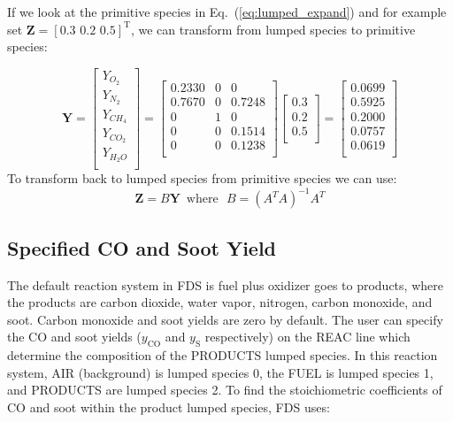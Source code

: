 If we look at the primitive species in Eq.~(\ref{eq:lumped_expand}) and for example set $\mathbf{Z} = [0.3\, \, 0.2\, \, 0.5]^\mathrm{T}$, we can transform from lumped species to primitive species:

\begin{displaymath}
\mathbf{Y}=\left[\begin{array}{c}
       Y_{O_2} \\
       Y_{N_2} \\
       Y_{CH_4} \\
       Y_{CO_2} \\
       Y_{H_2O} \\
     \end{array}\right]
     =\left[\begin{array}{ccc}
     0.2330 & 0 & 0 \\
     0.7670 & 0 & 0.7248 \\
     0 & 1 & 0 \\
     0 & 0 & 0.1514 \\
     0 & 0 & 0.1238 \\
     \end{array}\right]
     \left[\begin{array}{c}
     0.3 \\
     0.2 \\
     0.5 \\
     \end{array}\right]
     =\left[\begin{array}{c}
     0.0699\\
     0.5925\\
     0.2000\\
     0.0757\\
     0.0619\\
     \end{array}\right]
\end{displaymath}
To transform back to lumped species from primitive species we can use:
\begin{equation}\label{eq:transform_back}
\textbf{Z}=B\textbf{Y} \, \, \, \text{where} \, \, \, \, B=(A^TA)^{-1}A^T
\end{equation}

\subsection{Specified CO and Soot Yield}
The default reaction system in FDS is fuel plus oxidizer goes to products, where the products are carbon dioxide, water vapor, nitrogen, carbon monoxide, and soot. Carbon monoxide and soot yields are zero by default. The user can specify the CO and soot yields ($y_{\mathrm{CO}}$ and $y_{\mathrm{S}}$ respectively) on the {\ct REAC} line which determine the composition of the {\ct PRODUCTS} lumped species. In this reaction system, {\ct AIR} (background) is lumped species 0, the {\ct FUEL} is lumped species 1, and {\ct PRODUCTS} are lumped species 2. To find the stoichiometric coefficients of CO and soot within the product lumped species, FDS uses:  

